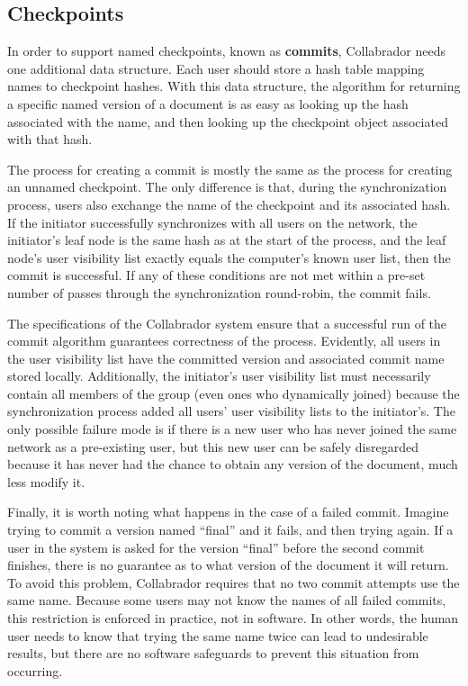 \documentclass[11pt,titlepage]{article}
\begin{document}
\subsection{Checkpoints}

In order to support named checkpoints, known as \textbf{commits},
Collabrador needs one additional data structure. Each user should
store a hash table mapping names to checkpoint hashes. With this data
structure, the algorithm for returning a specific named version of a
document is as easy as looking up the hash associated with the name,
and then looking up the checkpoint object associated with that hash.

The process for creating a commit is mostly the same as the process
for creating an unnamed checkpoint. The only difference is that,
during the synchronization process, users also exchange the name of
the checkpoint and its associated hash. If the initiator successfully
synchronizes with all users on the network, the initiator's leaf node
is the same hash as at the start of the process, and the leaf node's
user visibility list exactly equals the computer's known user list,
then the commit is successful. If any of these conditions are not met
within a pre-set number of passes through the synchronization
round-robin, the commit fails.

The specifications of the Collabrador system ensure that a successful
run of the commit algorithm guarantees correctness of the
process. Evidently, all users in the user visibility list have the
committed version and associated commit name stored
locally. Additionally, the initiator's user visibility list must
necessarily contain all members of the group (even ones who
dynamically joined) because the synchronization process added all
users' user visibility lists to the initiator's. The only possible
failure mode is if there is a new user who has never joined the same
network as a pre-existing user, but this new user can be safely
disregarded because it has never had the chance to obtain any version
of the document, much less modify it.

Finally, it is worth noting what happens in the case of a failed
commit. Imagine trying to commit a version named ``final'' and it
fails, and then trying again. If a user in the system is asked for the
version ``final'' before the second commit finishes, there is no
guarantee as to what version of the document it will return. To avoid
this problem, Collabrador requires that no two commit attempts use the
same name. Because some users may not know the names of all failed
commits, this restriction is enforced in practice, not in software. In
other words, the human user needs to know that trying the same name
twice can lead to undesirable results, but there are no software
safeguards to prevent this situation from occurring.
\end{document}
